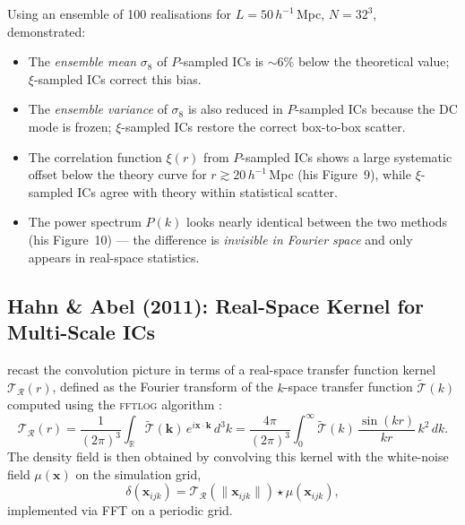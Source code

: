 \documentclass[12pt]{article}
\begin{document}
Using an ensemble of 100 realisations for $L = 50\,h^{-1}$\,Mpc,
$N = 32^3$, \citet{Sirko2005} demonstrated:
%
\begin{itemize}
  \item The \emph{ensemble mean} $\sigma_8$ of $P$-sampled ICs is
        $\sim 6\%$ below the theoretical value; $\xi$-sampled ICs
        correct this bias.
  \item The \emph{ensemble variance} of $\sigma_8$ is also reduced in
        $P$-sampled ICs because the DC mode is frozen; $\xi$-sampled
        ICs restore the correct box-to-box scatter.
  \item The correlation function $\xi(r)$ from $P$-sampled ICs shows a
        large systematic offset below the theory curve for $r \gtrsim
        20\,h^{-1}$\,Mpc (his Figure~9), while $\xi$-sampled ICs agree
        with theory within statistical scatter.
  \item The power spectrum $P(k)$ looks nearly identical between the two
        methods (his Figure~10) --- the difference is \emph{invisible in
        Fourier space} and only appears in real-space statistics.
\end{itemize}

\subsection{Hahn \& Abel (2011): Real-Space Kernel for Multi-Scale ICs}

\citet{Hahn2011} recast the convolution picture in terms of a real-space
transfer function kernel $\mathcal{T}_\mathcal{R}(r)$, defined as the
Fourier transform of the $k$-space transfer function $\tilde{\mathcal{T}}(k)$
computed using the \textsc{fftlog} algorithm \citep{Talman1978,
Hamilton2000}:
\begin{equation}
  \mathcal{T}_\mathcal{R}(r) = \frac{1}{(2\pi)^3}
  \int_\mathbb{R} \tilde{\mathcal{T}}(\mathbf{k})\,
  e^{i\mathbf{x}\cdot\mathbf{k}}\,d^3k
  = \frac{4\pi}{(2\pi)^3}\int_0^\infty
  \tilde{\mathcal{T}}(k)\,\frac{\sin(kr)}{kr}\,k^2\,dk.
  \label{eq:realkernel}
\end{equation}
The density field is then obtained by convolving this kernel with the
white-noise field $\mu(\mathbf{x})$ on the simulation grid,
\begin{equation}
  \delta(\mathbf{x}_{ijk}) = \mathcal{T}_\mathcal{R}(\|\mathbf{x}_{ijk}\|)
  \star \mu(\mathbf{x}_{ijk}),
\end{equation}
implemented via FFT on a periodic grid.
\end{document}
